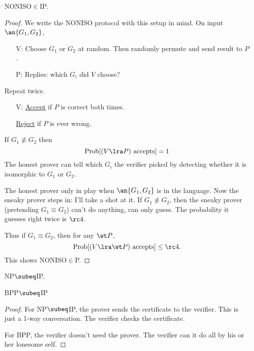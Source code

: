 \begin{thm}
NONISO$\in$IP.
\end{thm}

\begin{proof}
We write the NONISO protocol with this setup in mind. On input $\an{G_1,G_2}$,
\begin{enumerate}
\item[V:] Choose $G_1$ or $G_2$ at random. Then randomly permute and send result to $P$.
\item[P:] Replies: which $G_i$ did $V$ choose?
\end{enumerate}
Repeat twice.
\begin{enumerate}
\item[V:] \ul{Accept} if $P$ is correct both times.

\ul{Reject} if $P$ is ever wrong.
\end{enumerate}
If $G_1\nequiv G_2$ then 
\[
\text{Prob}[(V\lra P)\text{ accepts}]=1
\]
The honest prover can tell which $G_i$ the verifier picked by detecting whether it is isomorphic to $G_1$ or $G_2$.

The honest prover only in play when $\an{G_1,G_2}$ is in the language. Now the sneaky prover steps in: I'll take a shot at it. If $G_1\nequiv G_2$, then the sneaky prover (pretending $G_1\equiv G_2$) can't do anything, can only guess. The probability it guesses right twice is $\rc4$.

Thus if $G_1\equiv G_2$, then for any $\wt P$,
\[
\text{Prob}[(V\lra \wt P)\text{ accepts}]\le\rc4.
\]
This shows NONISO$\in$P.
\end{proof}

\begin{pr}
NP$\subeq$IP.

BPP$\subeq$IP
\end{pr}
\begin{proof}
For NP$\subeq$IP, 
the prover sends the certificate to the verifier. This is just a 1-way conversation. The verifier checks the certificate.

For BPP, the verifier doesn't need the prover. The verifier can it do all by his or her lonesome self.
\end{proof}

